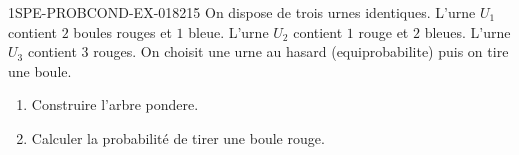 \begin{exercice}{1SPE-PROBCOND-EX-018}{2}{15}
On dispose de trois urnes identiques. L'urne $U_1$ contient $2$ boules rouges et $1$ bleue. L'urne $U_2$ contient $1$ rouge et $2$ bleues. L'urne $U_3$ contient $3$ rouges. On choisit une urne au hasard (equiprobabilite) puis on tire une boule.

\begin{enumerate}
  \item Construire l'arbre pondere.
  \item Calculer la probabilité de tirer une boule rouge.
\end{enumerate}
\end{exercice}
